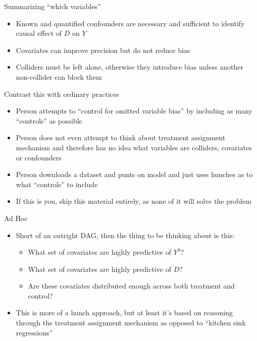 \documentclass{beamer}
\begin{document}
\begin{frame}{Summarizing ``which variables''}

\begin{itemize}
\item Known and quantified confounders are necessary and sufficient to identify causal effect of $D$ on $Y$
\item Covariates can improve precision but do not reduce bias
\item Colliders must be left alone, otherwise they introduce bias unless another non-collider can block them
\end{itemize}

\end{frame}

\begin{frame}{Contrast this with ordinary practices}

\begin{itemize}
\item Person attempts to ``control for omitted variable bias'' by including as many ``controls'' as possible
\item Person does not even attempt to think about treatment assignment mechanism and therefore has no idea what variables are colliders, covariates or confounders
\item Person downloads a dataset and punts on model and just uses hunches as to what ``controls'' to include
\item If this is you, skip this material entirely, as none of it will solve the problem
\end{itemize}

\end{frame}

\begin{frame}{Ad Hoc}

\begin{itemize}
\item Short of an outright DAG, then the thing to be thinking about is this:
	\begin{itemize}
	\item What set of covariates are highly predictive of $Y^0$?
	\item What set of covariates are highly predictive of $D$?
	\item Are these covariates distributed enough across both treatment and control?
	\end{itemize}
\item This is more of a hunch approach, but at least it's based on reasoning through the treatment assignment mechanism as opposed to ``kitchen sink regressions''
\end{itemize}

\end{frame}
\end{document}
